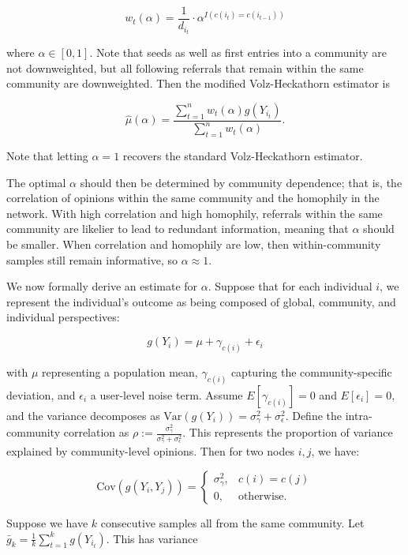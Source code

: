 \documentclass[11pt,a4paper,twocolumn,twoside]{rho-class/rho}
\begin{document}
\begin{equation}\label{eq:main_estimator}
w_t(\alpha) = \frac{1}{d_{i_t}} \cdot \alpha^{I(c(i_t) = c(i_{t - 1}))}
\end{equation}

\noindent where $\alpha \in [0, 1].$ Note that seeds as well as first entries into a community are not downweighted, but all following referrals that remain within the same community are downweighted. Then the modified Volz-Heckathorn estimator is

\[
\hat \mu(\alpha) = \frac{\sum_{t = 1}^n w_t(\alpha) g(Y_{i_t})}{\sum_{t = 1}^n w_t(\alpha)}.
\]

\noindent Note that letting $\alpha = 1$ recovers the standard Volz-Heckathorn estimator.

The optimal $\alpha$ should then be determined by community dependence; that is, the correlation of opinions within the same community and the homophily in the network. With high correlation and high homophily, referrals within the same community are likelier to lead to redundant information, meaning that $\alpha$ should be smaller. When correlation and homophily are low, then within-community samples still remain informative, so $\alpha \approx 1$.

We now formally derive an estimate for $\alpha$. Suppose that for each individual $i$, we represent the individual's outcome as being composed of global, community, and individual perspectives:

\[
g(Y_i) = \mu + \gamma_{c(i)} + \epsilon_i
\]

\noindent with $\mu$ representing a population mean, $\gamma_{c(i)}$ capturing the community-specific deviation, and $\epsilon_i$ a user-level noise term. Assume $E[\gamma_{c(i)}] = 0$ and $E[\epsilon_i] = 0,$ and the variance decomposes as $\text{Var}(g(Y_i)) = \sigma^2_\gamma + \sigma^2_\epsilon.$ Define the intra-community correlation as $\rho := \frac{\sigma^2_\gamma}{\sigma^2_\gamma + \sigma^2_\epsilon}$. This represents the proportion of variance explained by community-level opinions.
Then for two nodes $i, j$, we have:

\[
\text{Cov}(g(Y_i, Y_j)) = \begin{cases}
    \sigma^2_\gamma, &c(i) = c(j) \\
    0, &\text{otherwise.}
\end{cases}
\]

\noindent Suppose we have $k$ consecutive samples all from the same community. Let $\bar g_k = \frac{1}{k} \sum_{t = 1}^k g(Y_{i_t}).$ This has variance
\end{document}
